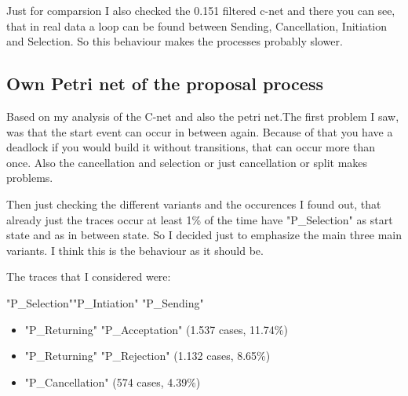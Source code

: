 Just for comparsion I also checked the 0.151 filtered c-net and there you can see, that in real data a loop can be found between Sending, Cancellation, Initiation and Selection. So this behaviour makes the processes probably slower.

\subsection{Own Petri net of the proposal process}
Based on my analysis of the C-net and also the petri net.The first problem I saw, was that the start event can occur in between again. Because of that you have a deadlock if you would build it without transitions, that can occur more than once. Also the cancellation and selection or just cancellation or split makes problems. 

Then just checking the different variants and the occurences I found out, that already just the traces occur at least 1\% of the time have "P\_Selection" as start state and as in between state. So I decided just to emphasize the main three main variants. I think this is the behaviour as it should be.

The traces that I considered were:

"P\_Selection"\textrightarrow "P\_Intiation" \textrightarrow "P\_Sending"\textrightarrow
\begin{itemize}
	\item "P\_Returning" \textrightarrow "P\_Acceptation" (1.537 cases, 11.74\%)
	\item "P\_Returning" \textrightarrow "P\_Rejection" (1.132 cases, 8.65\%)
	\item "P\_Cancellation" (574 cases, 4.39\%)
\end{itemize}


